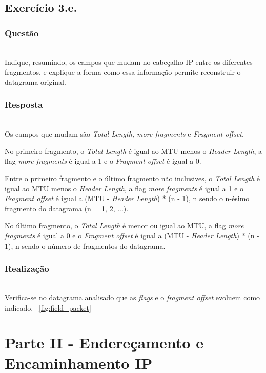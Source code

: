 \documentclass{llncs}
\begin{document}
\subsection{Exercício 3.e.}
\subsubsection{Questão}\rule[-10pt]{0pt}{10pt}\\

Indique, resumindo, os campos que mudam no cabeçalho IP entre os diferentes fragmentos, e explique a forma como essa informação permite reconstruir o datagrama original. 

\subsubsection{Resposta}\rule[-10pt]{0pt}{10pt}\\

Os campos que mudam são \textit{Total Length, more fragments} e \textit{Fragment offset}. 

No primeiro fragmento, o \textit{Total Length} é igual ao MTU menos o \textit{Header Length}, a flag \textit{more fragments} é igual a 1 e o \textit{Fragment offset} é igual a 0.

Entre o primeiro fragmento e o último fragmento não inclusives, o \textit{Total Length} é igual ao MTU menos o \textit{Header Length}, a flag \textit{more fragments} é igual a 1 e o \textit{Fragment offset} é igual a (MTU - \textit{Header Length}) * (n - 1), n sendo o n-ésimo fragmento do datagrama (n = 1, 2, ...).

No último fragmento, o \textit{Total Length} é menor ou igual ao MTU, a flag \textit{more fragments} é igual a 0 e o \textit{Fragment offset} é igual a (MTU - \textit{Header Length}) * (n - 1), n sendo o número de fragmentos do datagrama.

\subsubsection{Realização}\rule[-10pt]{0pt}{10pt}\\
Verifica-se no datagrama analisado que as \textit{flags} e o \textit{fragment offset} evoluem como indicado.
~\ref{fig:field_packet} 


\pagebreak
\section{Parte II - Endereçamento e Encaminhamento IP}
\end{document}
